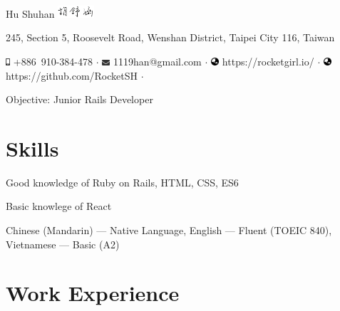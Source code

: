 \documentclass[a4paper,10pt]{article}
\begin{document}
\pagestyle{empty} %
\frenchspacing


\begin{center}
  \Huge{Hu Shuhan \includegraphics[height=1.2em,trim=0 10mm 0 -1cm]{shared/signature.png}}\par

\normalsize 245, Section 5, Roosevelt Road, Wenshan District, Taipei City 116, Taiwan 

  \includegraphics[height=0.7em]{shared/mobile-alt.eps} +886~910-384-478 $\cdot$
  \includegraphics[width=0.8em]{shared/envelope.eps} 1119han@gmail.com $\cdot$
  \includegraphics[width=0.8em]{shared/globe-asia.eps} https://rocketgirl.io/ $\cdot$
  \includegraphics[width=0.8em]{shared/globe-asia.eps} https://github.com/RocketSH $\cdot$

  \vspace*{1em}
{\centering\sffamily \large Objective: Junior Rails Developer}
\end{center}


\section{Skills}
Good knowledge of Ruby on Rails, HTML, CSS, ES6

Basic knowlege of React

{Chinese (Mandarin)} --- Native Language, {English} --- Fluent (TOEIC 840), {Vietnamese} --- Basic (A2)

\section{Work Experience}
\end{document}
